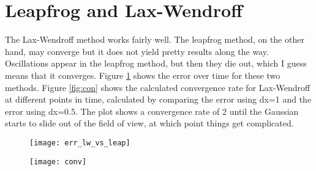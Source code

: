 \documentclass{article}
\begin{document}
\section{Leapfrog and Lax-Wendroff}
The Lax-Wendroff method works fairly well.  The leapfrog method, on the other hand, may converge but it does not yield
pretty results along the way.  Oscillations appear in the leapfrog method, but then they die out, which I guess means that it
converges.  Figure \ref{fig:compare2} shows the error over time for these two methods.  Figure \ref{fig:con} shows the calculated
convergence rate for Lax-Wendroff at different points in time, calculated by comparing the error using dx=1 and the error using
dx=0.5.  The plot shows a convergence rate of 2 until the Gaussian starts to slide out of the field of view, at which point
things get complicated.

\begin{figure}[h]
  \begin{center}
     \texttt{[image: err\_lw\_vs\_leap]}
  \end{center}
  \label{fig:compare2}
\end{figure}

\begin{figure}[h]
  \begin{center}
     \texttt{[image: conv]}
  \end{center}
  \label{fig:conv}
\end{figure}
\end{document}
